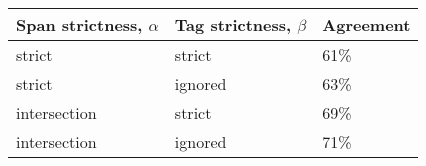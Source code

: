 \begin{tabular}{|p{} p{}|p{}|}
\hline
\multicolumn{1}{|c}{Span strictness, $\alpha$} & \multicolumn{1}{c|}{Tag strictness, $\beta$}            & \multicolumn{1}{c|}{Agreement}                                          

\\ \hline
strict & strict & 61\% \\ 
strict & ignored & 63\% \\ 
intersection & strict & 69\% \\ 
intersection & ignored & 71\% \\ \hline
\end{tabular}